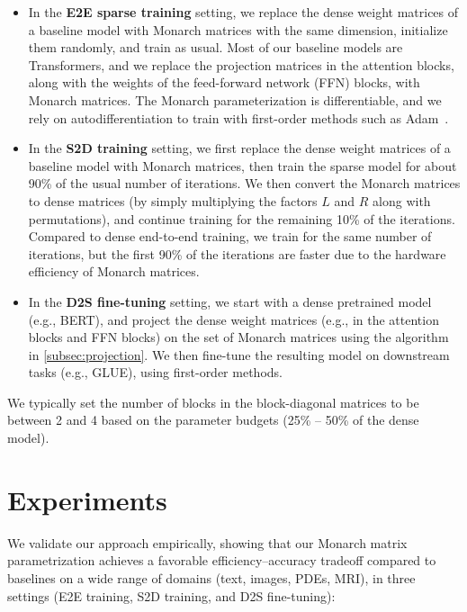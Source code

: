 \begin{itemize}[leftmargin=*,nosep,nolistsep]
  \item In the \textbf{E2E sparse training} setting, we replace the dense weight matrices of a baseline model with Monarch matrices with the same dimension, initialize them randomly, and train as usual. Most of our baseline models are Transformers, and we replace the projection matrices in the attention blocks, along with the weights of the feed-forward network (FFN) blocks, with Monarch matrices. The Monarch parameterization is differentiable, and we rely on autodifferentiation to train with first-order methods such as Adam~\citep{kingma2014adam}.

  \item In the \textbf{S2D training} setting, we first replace the dense weight matrices of a baseline model with Monarch matrices, then train the sparse model for about 90\% of the usual number of iterations. We then convert the Monarch matrices to dense matrices (by simply multiplying the factors $L$ and $R$ along with permutations), and continue training for the remaining 10\% of the iterations. Compared to dense end-to-end training, we train for the same number of iterations, but the first 90\% of the iterations are faster due to the hardware efficiency of Monarch matrices.

  \item In the \textbf{D2S fine-tuning} setting, we start with a dense pretrained model (e.g., BERT), and project the dense weight matrices (e.g., in the attention blocks and FFN blocks) on the set of Monarch matrices using the algorithm in \ref{subsec:projection}.
  We then fine-tune the resulting model on downstream tasks (e.g., GLUE), using first-order methods.
\end{itemize}

We typically set the number of blocks in the block-diagonal matrices to be between 2 and 4 based on the parameter budgets (25\% -- 50\% of the dense model).

\section{Experiments}
\label{sec:experiments}

We validate our approach empirically, showing that our Monarch matrix parametrization achieves a favorable efficiency--accuracy tradeoff compared to baselines on a wide range of domains (text, images, PDEs, MRI), in three settings (E2E training, S2D training, and D2S fine-tuning):

